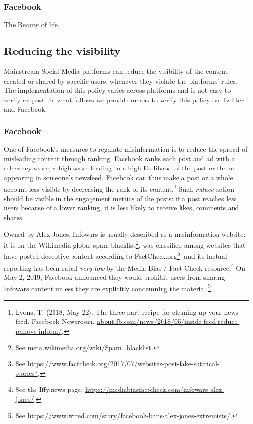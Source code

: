 \documentclass[11pt,a4paper]{article}
\begin{document}
\subsubsection{Facebook}

{\color{pink}The Beauty of life}

\subsection{Reducing the visibility}

Mainstream Social Media platforms can reduce the visibility of the content created or shared by specific users, whenever they violate the platforms' rules. The implementation of this policy varies across platforms and is not easy to verify ex-post. In what follows we provide means to verify this policy on Twitter and Facebook.  

\subsubsection{Facebook}

One of Facebook’s measures to regulate misinformation is to reduce the spread of misleading content through ranking. Facebook ranks each post and ad with a relevancy score, a high score leading to a high likelihood of the post or the ad appearing in someone’s newsfeed. Facebook can thus make a post or a whole account less visible by decreasing the rank of its content.\footnote{Lyons, T. (2018, May 22). The three-part recipe for cleaning up your news feed. Facebook Newsroom. \href{https://about.fb.com/news/2018/05/inside-feed-reduce-remove-inform/}{about.fb.com/news/2018/05/inside-feed-reduce-remove-inform/}.} Such {\it reduce} action should be visible in the engagement metrics of the posts: if a post reaches less users because of a lower ranking, it is less likely to receive likes, comments and shares.

Owned by Alex Jones, Infowars is usually described as a misinformation website: it is on the Wikimedia global spam blacklist\footnote{See \href{https://meta.wikimedia.org/wiki/Spam\_blacklist}{meta.wikimedia.org/wiki/Spam\_blacklist}.}, was classified among websites that have posted deceptive content according to FactCheck.org\footnote{See \href{https://www.factcheck.org/2017/07/websites-post-fake-satirical-stories/}{https://www.factcheck.org/2017/07/websites-post-fake-satirical-stories/}.}, and its factual reporting has been rated {\it very low} by the Media Bias / Fact Check resource.\footnote{See the Iffy.news page: \href{https://mediabiasfactcheck.com/infowars-alex-jones/}{https://mediabiasfactcheck.com/infowars-alex-jones/}.} On May 2, 2019, Facebook announced they would prohibit users from sharing Infowars content unless they are explicitly condemning the material.\footnote{See \href{https://www.wired.com/story/facebook-bans-alex-jones-extremists/}{https://www.wired.com/story/facebook-bans-alex-jones-extremists/}.}
\end{document}
